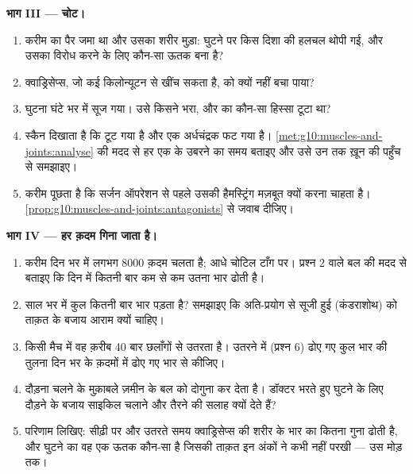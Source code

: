 \begin{problem}
\medskip
\noindent\textbf{भाग III --- चोट।}
\begin{enumerate}[resume]
  \item करीम का पैर जमा था और उसका शरीर मुड़ा: घुटने पर किस दिशा की
        हलचल थोपी गई, और उसका विरोध करने के लिए कौन-सा ऊतक बना है?
  \item क्वाड्रिसेप्स, जो कई किलोन्यूटन से खींच सकता है,  को क्यों
        नहीं बचा पाया?
  \item घुटना घंटे भर में सूज गया। उसे किसने भरा, और  का कौन-सा
        हिस्सा टूटा था?
  \item स्कैन दिखाता है कि  टूट गया है और एक अर्धचंद्रक फट गया है।
        \cref{met:g10:muscles-and-joints:analyse} की मदद से हर एक के
        उबरने का समय बताइए और उसे उन तक ख़ून की पहुँच से समझाइए।
  \item करीम पूछता है कि सर्जन ऑपरेशन से पहले उसकी हैमस्ट्रिंग मज़बूत
        क्यों करना चाहता है। \cref{prop:g10:muscles-and-joints:antagonists}
        से जवाब दीजिए।
\end{enumerate}

\medskip
\noindent\textbf{भाग IV --- हर क़दम गिना जाता है।}
\begin{enumerate}[resume]
  \item करीम दिन भर में लगभग 8000 क़दम चलता है; आधे चोटिल टाँग पर।
        प्रश्न 2 वाले बल की मदद से बताइए कि  दिन में कितनी बार कम
        से कम उतना भार ढोती है।
  \item साल भर में कुल कितनी बार भार पड़ता है? समझाइए कि अति-प्रयोग से
        सूजी हुई  (कंडराशोथ) को ताक़त के बजाय आराम क्यों चाहिए।
  \item किसी मैच में वह क़रीब 40 बार छलाँगों से उतरता है। उतरने में
        (प्रश्न 6) ढोए गए कुल भार की तुलना दिन भर के क़दमों में ढोए गए
        भार से कीजिए।
  \item दौड़ना चलने के मुक़ाबले ज़मीन के बल को दोगुना कर देता है।
        डॉक्टर भरते हुए घुटने के लिए दौड़ने के बजाय साइकिल चलाने और
        तैरने की सलाह क्यों देते हैं?
  \item परिणाम लिखिए: सीढ़ी पर और उतरते समय क्वाड्रिसेप्स की  शरीर
        के भार का कितना गुना ढोती है, और घुटने का वह एक ऊतक कौन-सा है
        जिसकी ताक़त इन अंकों ने कभी नहीं परखी --- उस मोड़ तक।
\end{enumerate}
\end{problem}
